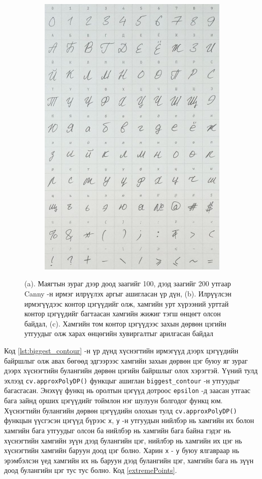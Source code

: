 \begin{figure}[H]
\begin{subfigure}{0.32\textwidth}
		\includegraphics[width=0.85\linewidth]{images/sheet_final_transformed}
		\caption{}
		\label{fig:sheet_final_transformed}
	\end{subfigure}
	\caption{(a). Маягтын зураг дээр доод заагийг 100, дээд заагийг 200 утгаар Canny -н ирмэг илрүүлэх аргыг ашигласан үр дүн, (b). Илрүүлсэн ирмэгүүдээс контор цэгүүдийг олж, хамгийн урт хүрээний урттай контор цэгүүдийг багтаасан хамгийн жижиг тэгш өнцөгт олсон байдал, (c). Хамгийн том контор цэгүүдээс захын дөрвөн цэгийн утгуудыг олж харах өнцөгийн хувиргалтыг арилгасан байдал}
	\label{fig:sheet_processing}
\end{figure}

Код \ref{lst:biggest_contour} -н үр дүнд хүснэгтийн ирмэгүүд дээрх цэгүүдийн байршлыг олж авах бөгөөд эдгээрээс хамгийн захын дөрвөн цэг буюу яг зураг дээрх хүснэгтийн булангийн дөрвөн цэгийн байршлыг олох хэрэгтэй. Үүний тулд эхлээд \texttt{cv.approxPolyDP()} функцыг ашиглан \texttt{biggest\_contour} -н утгуудыг багасгасан. Энэхүү функц нь оролтын цэгүүд дотроос \texttt{epsilon} -д заасан утгаас бага зайнд орших цэгүүдийг тоймлон нэг шулуун болгодог функц юм. Хүснэгтийн булангийн дөрвөн цэгүүдийн олохын тулд \texttt{cv.approxPolyDP()} функцын үүсгэсэн цэгүүд бүрээс \texttt{x}, \texttt{y} -н утгуудын нийлбэр нь хамгийн их болон хамгийн бага утгуудыг олсон ба нийлбэр нь хамгийн бага байна гэдэг нь хүснэгтийн хамгийн зүүн дээд булангийн цэг, нийлбэр нь хамгийн их цэг нь хүснэгтийн хамгийн баруун доод цэг болно. Харин \texttt{x} - \texttt{y} буюу ялгавраар нь эрэмбэлсэн үед хамгийн их нь баруун дээд булангийн цэг, хамгийн бага нь зүүн доод булангийн цэг тус тус болно. Код \ref{extremePoints}.


